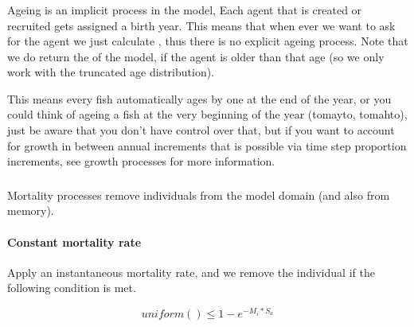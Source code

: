 \subsubsection{}
Ageing is an implicit process in the model, Each agent that is created or recruited gets assigned a birth year. This means that when ever we want to ask for the agent we just calculate , thus there is no explicit ageing process. Note that we do return the  of the model, if the agent is older than that age (so we only work with the truncated age distribution).


This means every fish automatically ages by one at the end of the year, or you could think of ageing a fish at the very beginning of the year (tomayto, tomahto), just be aware that you don't  have control over that, but if you want to account for growth in between annual increments that is possible via time step proportion increments, see growth processes for more information.

\subsubsection{}

\paragraph{}\label{subsubsec:constant-recruitment}

\paragraph{}\label{subsubsec:bev-holt-recruitment}


\subsubsection{\label{sec:mortality}}
Mortality processes remove individuals from the model domain (and also from memory).

\paragraph{Constant mortality rate}
Apply an instantaneous mortality rate, and we remove the individual if the following condition is met.

\begin{equation}\label{constan_mort}
uniform() \leq 1 - e^{-M_i * S_a}
\end{equation}

